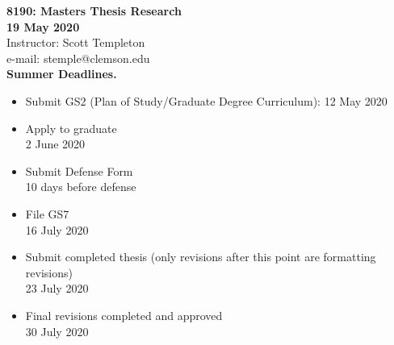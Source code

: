 
\let\counterwithout\relax
\let\counterwithin\relax
{}



\noindent \textbf{8190: Masters Thesis Research}\\
\noindent \textbf{19 May 2020}\\
\noindent Instructor: Scott Templeton \\
e-mail: stemple@clemson.edu\\

\noindent \textbf{Summer Deadlines.}\\
\begin{itemize}
    \item Submit GS2 (Plan of Study/Graduate Degree Curriculum): 12 May 2020
    \item Apply to graduate\\
    2 June 2020
    \item Submit Defense Form\\
    10 days before defense
    \item File GS7\\
    16 July 2020
    \item Submit completed thesis (only revisions after this point are formatting revisions)\\
    23 July 2020
    \item Final revisions completed and approved\\
    30 July 2020
\end{itemize}

